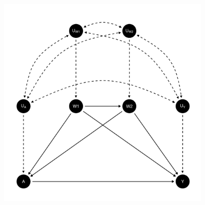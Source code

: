 \documentclass{article}\usepackage[]{graphicx}\usepackage[]{xcolor}
\newenvironment{knitrout}{}{} %
\begin{document}
 
 
 
 
 
 
 
 
 
 
 
 
 
 
 
    
\begin{knitrout}
\color{fgcolor}
\includegraphics[width=4in]{figure/unnamed-chunk-16-1} 

\end{knitrout}
      
      
      
\end{document}
